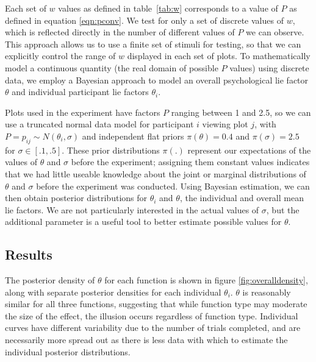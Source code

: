 \documentclass[11pt]{isuthesis}\usepackage[]{graphicx}\usepackage[]{color}
\begin{document}
Each set of $w$ values as defined in table~\ref{tab:w} corresponds  to a value of $P$ as defined in equation \ref{eqn:pconv}. 
We test for only a set of discrete values of $w$, which is reflected directly in the number of different values of $P$ we can observe. This approach allows us to use a finite set of stimuli for testing, so that we can explicitly control the range of $w$ displayed in each set of plots. To mathematically model a continuous quantity (the real domain of possible $P$ values) using discrete data, we employ a Bayesian approach to model an overall psychological lie factor $\theta$ and individual participant lie factors $\theta_i$.

Plots used in the experiment have factors $P$ ranging between 1 and 2.5,  so we can use a truncated normal data model for participant $i$ viewing plot $j$, with $P = p_{ij} \sim N(\theta_i, \sigma)$ and independent flat priors $\pi(\theta)= 0.4$ and $\pi(\sigma)=2.5$ for $\sigma\in[.1, .5]$. These prior distributions $\pi(.)$ represent our expectations of the values of $\theta$ and $\sigma$ before the experiment; assigning them constant values indicates that we had little useable knowledge about the joint or marginal distributions of $\theta$ and $\sigma$ before the experiment was conducted. Using Bayesian estimation, we can then obtain posterior distributions for $\theta_i$ and $\theta$, the individual and overall mean lie factors. We are not particularly interested in the actual values of $\sigma$, but the additional parameter is a useful tool to better estimate possible values for $\theta$. 

\subsection{Results}
The posterior density of $\theta$ for each function is shown in figure \ref{fig:overalldensity}, along with separate posterior densities for each individual $\theta_i$. $\theta$ is reasonably similar for all three functions, suggesting that while function type may moderate the size of the effect, the illusion occurs regardless of function type. Individual curves have different variability due to the number of trials completed, and are necessarily more spread out as there is less data with which to estimate the individual posterior distributions. 
\end{document}

